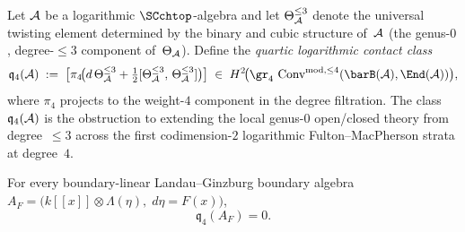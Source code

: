 \begin{definition}
\label{def:quartic-log-contact-class}
Let $\mathcal{A}$ be a logarithmic $\SCchtop$-algebra and let
$\Theta^{\leq 3}_{\mathcal{A}}$ denote the universal twisting element
determined by the binary and cubic structure of~$\mathcal{A}$
(the genus-$0$, degree-$\leq 3$ component of~$\Theta_{\mathcal{A}}$).
Define the \emph{quartic logarithmic contact class}
\begin{equation}\label{eq:quartic-log-contact}
\mathfrak{q}_4(\cA)
\;:=\;
\bigl[\pi_4\!\bigl(
 d\,\Theta^{\leq 3}_\cA
 + \tfrac{1}{2}[\Theta^{\leq 3}_\cA,\,\Theta^{\leq 3}_\cA]
\bigr)\bigr]
\;\in\;
H^2\!\bigl(\gr_4\, \Conv^{\mathrm{mod},\leq 4}(\barB(\cA),\End(\cA))\bigr),
\end{equation}
where $\pi_4$ projects to the weight-$4$ component in the
degree filtration. The class $\mathfrak{q}_4(\mathcal{A})$ is the
obstruction to extending the local genus-$0$ open/closed theory
from degree~$\leq 3$ across the first codimension-$2$ logarithmic
Fulton--MacPherson strata at degree~$4$.
\end{definition}

\begin{proposition}
\label{prop:quartic-contact-vanishes-BL}
For every boundary-linear Landau--Ginzburg boundary algebra
$A_F = \bigl(k[\![x]\!] \otimes \Lambda(\eta),\; d\eta = F(x)\bigr)$,
\[
 \mathfrak{q}_4(A_F) = 0.
\]
\end{proposition}

